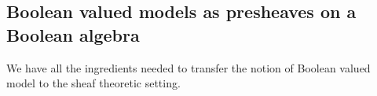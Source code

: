 \documentclass[11pt]{amsart}
\newcommand{\C}{\mathcal{C}}
\newcommand{\F}{\mathcal{F}}
\theoremstyle{plain}
\theoremstyle{definition}
\theoremstyle{plain}
\theoremstyle{remark}
\newtheorem{remark}[theorem]{Remark}
\newcommand{\bool}[1]{\mathsf{#1}}
\newcommand{\0}{\mathsf{0}}
\renewcommand{\1}{\mathsf{1}}
\renewcommand{\2}{\mathsf{2}}
\theoremstyle{definition}
\begin{document}


%

\subsection{Boolean valued models as presheaves on a Boolean algebra}
We have all the ingredients needed to transfer the notion of Boolean valued model to the sheaf theoretic setting.
\end{document}
